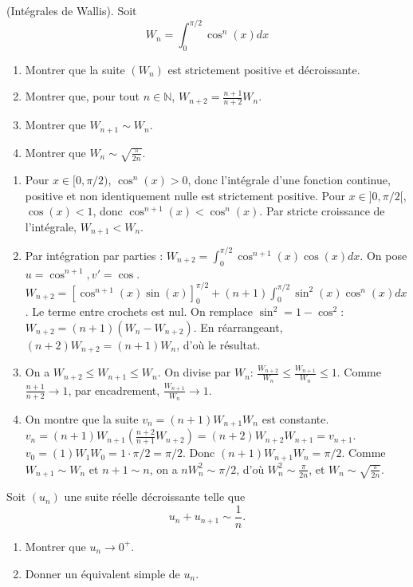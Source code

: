 \documentclass[solutions]{exercices}
\begin{document}
\begin{exercice}[\st]
	(Intégrales de Wallis).
	Soit \[W_n = \int_0^{\pi/2} \cos^n(x) dx\]
	\begin{enumerate}
		\item Montrer que la suite $(W_n)$ est strictement positive et décroissante.
		\item Montrer que, pour tout $n \in \mathbb{N}$, $W_{n+2} = \frac{n+1}{n+2} W_n$.
		\item Montrer que $W_{n+1} \sim W_n$.
		\item Montrer que $W_n \sim \sqrt{\frac{\pi}{2n}}$.
	\end{enumerate}
\end{exercice}

\begin{solution}
	\begin{enumerate}
		\item Pour $x \in [0, \pi/2)$, $\cos^n(x)>0$, donc l'intégrale d'une fonction continue, positive et non identiquement nulle est strictement positive. Pour $x \in ]0,\pi/2[$, $\cos(x) < 1$, donc $\cos^{n+1}(x) < \cos^n(x)$. Par stricte croissance de l'intégrale, $W_{n+1} < W_n$.
		\item Par intégration par parties : $W_{n+2} = \int_0^{\pi/2} \cos^{n+1}(x)\cos(x)dx$. On pose $u=\cos^{n+1}, v'=\cos$.
		      $W_{n+2} = [\cos^{n+1}(x)\sin(x)]_0^{\pi/2} + (n+1)\int_0^{\pi/2}\sin^2(x)\cos^n(x)dx$.
		      Le terme entre crochets est nul. On remplace $\sin^2=1-\cos^2$: $W_{n+2} = (n+1)(W_n - W_{n+2})$.
		      En réarrangeant, $(n+2)W_{n+2} = (n+1)W_n$, d'où le résultat.
		\item On a $W_{n+2} \le W_{n+1} \le W_n$. On divise par $W_n$: $\frac{W_{n+2}}{W_n} \le \frac{W_{n+1}}{W_n} \le 1$. Comme $\frac{n+1}{n+2} \to 1$, par encadrement, $\frac{W_{n+1}}{W_n} \to 1$.
		\item On montre que la suite $v_n = (n+1)W_{n+1}W_n$ est constante. $v_n = (n+1)W_{n+1} (\frac{n+2}{n+1}W_{n+2}) = (n+2)W_{n+2}W_{n+1}=v_{n+1}$.
		      $v_0 = (1)W_1 W_0 = 1 \cdot \pi/2 = \pi/2$. Donc $(n+1)W_{n+1}W_n = \pi/2$.
		      Comme $W_{n+1} \sim W_n$ et $n+1 \sim n$, on a $n W_n^2 \sim \pi/2$, d'où $W_n^2 \sim \frac{\pi}{2n}$, et $W_n \sim \sqrt{\frac{\pi}{2n}}$.
	\end{enumerate}
\end{solution}

\begin{exercice}[\st]
	Soit $(u_n)$ une suite réelle décroissante telle que \[u_n + u_{n+1} \sim \frac{1}{n}.\]
	\begin{enumerate}
		\item Montrer que $u_n \to 0^+$.
		\item Donner un équivalent simple de $u_n$.
	\end{enumerate}
\end{exercice}
\end{document}
